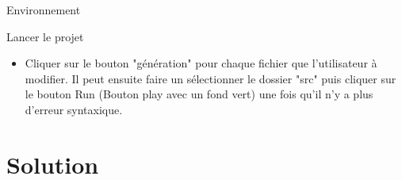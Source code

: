 \documentclass{bredelebeamer}
\begin{document}
\begin{frame}{Environnement}
\begin{block}{Lancer le projet}
\begin{itemize}
\item Cliquer sur le bouton "génération" pour chaque fichier que l'utilisateur à modifier. Il peut ensuite faire un sélectionner le dossier "src" puis cliquer sur le bouton Run (Bouton play avec un fond vert) une fois qu'il n'y a plus d'erreur syntaxique.
\end{itemize}
\end{block}\pause



\begin{figure}%
    \centering
    \qquad
    \label{fig:example}%
\end{figure}








\end{frame}

\section{Solution}
\end{document}
